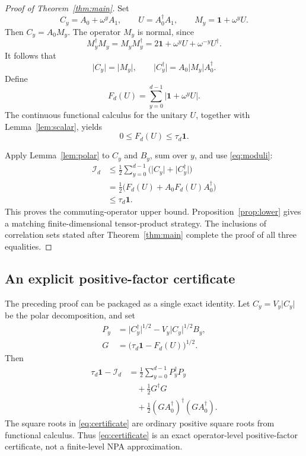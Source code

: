 \documentclass[11pt]{article}
\theoremstyle{remark}
\newcommand{\Id}{\mathbf 1}
\newcommand{\cI}{\mathcal I}
\newcommand{\absop}[1]{\lvert #1\rvert}
\begin{document}
\begin{proof}[Proof of Theorem~\ref{thm:main}]
Set
\[
  C_y=A_0+\omega^yA_1,
  \qquad
  U=A_0^\dagger A_1,
  \qquad
  M_y=\Id+\omega^yU.
\]
Then \(C_y=A_0M_y\).  The operator \(M_y\) is normal, since
\[
  M_y^\dagger M_y=M_yM_y^\dagger
  =
  2\Id+\omega^yU+\omega^{-y}U^\dagger.
\]
It follows that
\begin{equation}
  \absop{C_y}=\absop{M_y},
  \qquad
  \absop{C_y^\dagger}
  =
  A_0\absop{M_y}A_0^\dagger.
  \label{eq:moduli}
\end{equation}
Define
\[
  F_d(U)=\sum_{y=0}^{d-1}\absop{\Id+\omega^yU}.
\]
The continuous functional calculus for the unitary \(U\), together with
Lemma~\ref{lem:scalar}, yields
\begin{equation}
  0\leq F_d(U)\leq\tau_d\Id.
  \label{eq:F-bound}
\end{equation}

Apply Lemma~\ref{lem:polar} to \(C_y\) and \(B_y\), sum over \(y\),
and use \eqref{eq:moduli}:
\begin{align*}
  \cI_d
  &\leq
  \frac12\sum_{y=0}^{d-1}
       \bigl(\absop{C_y}+\absop{C_y^\dagger}\bigr)\\
  &=
  \frac12
  \bigl(F_d(U)+A_0F_d(U)A_0^\dagger\bigr)\\
  &\leq \tau_d\Id.
\end{align*}
This proves the commuting-operator upper bound.  Proposition~\ref{prop:lower}
gives a matching finite-dimensional tensor-product strategy.  The inclusions
of correlation sets stated after Theorem~\ref{thm:main} complete the proof of
all three equalities.
\end{proof}

\subsection{An explicit positive-factor certificate}

The preceding proof can be packaged as a single exact identity.  Let
\(C_y=V_y\absop{C_y}\) be the polar decomposition, and set
\begin{align*}
  P_y
  &=
  \absop{C_y^\dagger}^{1/2}
  -
  V_y\absop{C_y}^{1/2}B_y,\\
  G
  &=
  \bigl(\tau_d\Id-F_d(U)\bigr)^{1/2}.
\end{align*}
Then
\begin{equation}
\boxed{
\begin{aligned}
  \tau_d\Id-\cI_d
  &=
  \frac12\sum_{y=0}^{d-1}P_y^\dagger P_y\\
  &\quad+
  \frac12G^\dagger G\\
  &\quad+
  \frac12(GA_0^\dagger)^\dagger(GA_0^\dagger).
\end{aligned}
}
\label{eq:certificate}
\end{equation}
The square roots in \eqref{eq:certificate} are ordinary positive square roots
from functional calculus.  Thus \eqref{eq:certificate} is an exact
operator-level positive-factor certificate, not a finite-level NPA
approximation.
\end{document}
